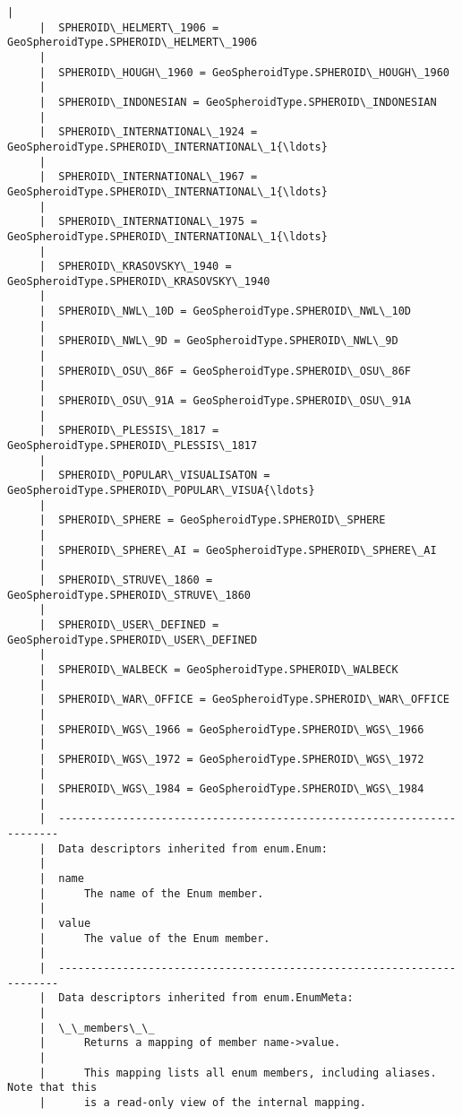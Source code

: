 \documentclass[11pt]{article}
\begin{document}
\begin{Verbatim}[commandchars=\\\{\}]
     |  
     |  SPHEROID\_HELMERT\_1906 = GeoSpheroidType.SPHEROID\_HELMERT\_1906
     |  
     |  SPHEROID\_HOUGH\_1960 = GeoSpheroidType.SPHEROID\_HOUGH\_1960
     |  
     |  SPHEROID\_INDONESIAN = GeoSpheroidType.SPHEROID\_INDONESIAN
     |  
     |  SPHEROID\_INTERNATIONAL\_1924 = GeoSpheroidType.SPHEROID\_INTERNATIONAL\_1{\ldots}
     |  
     |  SPHEROID\_INTERNATIONAL\_1967 = GeoSpheroidType.SPHEROID\_INTERNATIONAL\_1{\ldots}
     |  
     |  SPHEROID\_INTERNATIONAL\_1975 = GeoSpheroidType.SPHEROID\_INTERNATIONAL\_1{\ldots}
     |  
     |  SPHEROID\_KRASOVSKY\_1940 = GeoSpheroidType.SPHEROID\_KRASOVSKY\_1940
     |  
     |  SPHEROID\_NWL\_10D = GeoSpheroidType.SPHEROID\_NWL\_10D
     |  
     |  SPHEROID\_NWL\_9D = GeoSpheroidType.SPHEROID\_NWL\_9D
     |  
     |  SPHEROID\_OSU\_86F = GeoSpheroidType.SPHEROID\_OSU\_86F
     |  
     |  SPHEROID\_OSU\_91A = GeoSpheroidType.SPHEROID\_OSU\_91A
     |  
     |  SPHEROID\_PLESSIS\_1817 = GeoSpheroidType.SPHEROID\_PLESSIS\_1817
     |  
     |  SPHEROID\_POPULAR\_VISUALISATON = GeoSpheroidType.SPHEROID\_POPULAR\_VISUA{\ldots}
     |  
     |  SPHEROID\_SPHERE = GeoSpheroidType.SPHEROID\_SPHERE
     |  
     |  SPHEROID\_SPHERE\_AI = GeoSpheroidType.SPHEROID\_SPHERE\_AI
     |  
     |  SPHEROID\_STRUVE\_1860 = GeoSpheroidType.SPHEROID\_STRUVE\_1860
     |  
     |  SPHEROID\_USER\_DEFINED = GeoSpheroidType.SPHEROID\_USER\_DEFINED
     |  
     |  SPHEROID\_WALBECK = GeoSpheroidType.SPHEROID\_WALBECK
     |  
     |  SPHEROID\_WAR\_OFFICE = GeoSpheroidType.SPHEROID\_WAR\_OFFICE
     |  
     |  SPHEROID\_WGS\_1966 = GeoSpheroidType.SPHEROID\_WGS\_1966
     |  
     |  SPHEROID\_WGS\_1972 = GeoSpheroidType.SPHEROID\_WGS\_1972
     |  
     |  SPHEROID\_WGS\_1984 = GeoSpheroidType.SPHEROID\_WGS\_1984
     |  
     |  ----------------------------------------------------------------------
     |  Data descriptors inherited from enum.Enum:
     |  
     |  name
     |      The name of the Enum member.
     |  
     |  value
     |      The value of the Enum member.
     |  
     |  ----------------------------------------------------------------------
     |  Data descriptors inherited from enum.EnumMeta:
     |  
     |  \_\_members\_\_
     |      Returns a mapping of member name->value.
     |      
     |      This mapping lists all enum members, including aliases. Note that this
     |      is a read-only view of the internal mapping.
    

\end{Verbatim}
\end{document}
